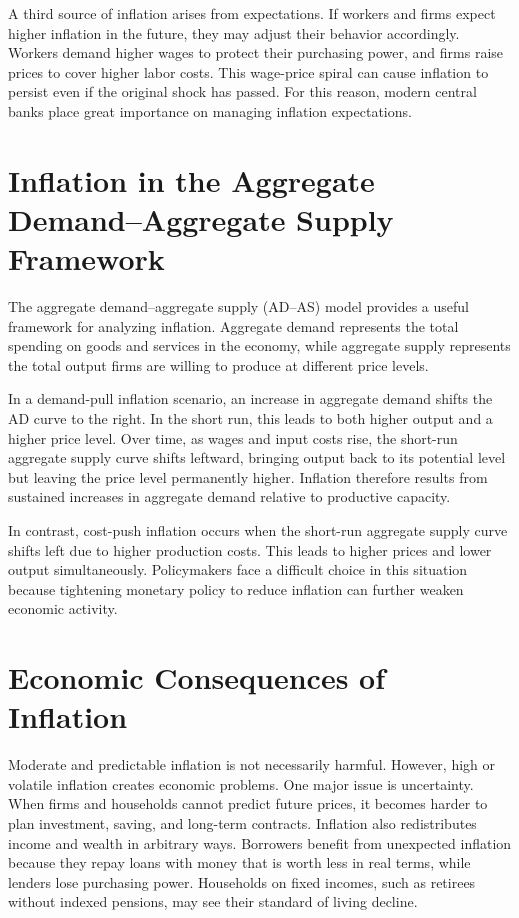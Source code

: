 \documentclass[12pt]{article}
\begin{document}
A third source of inflation arises from expectations. If workers and firms expect higher inflation in the future, they may adjust their behavior accordingly. Workers demand higher wages to protect their purchasing power, and firms raise prices to cover higher labor costs. This wage-price spiral can cause inflation to persist even if the original shock has passed. For this reason, modern central banks place great importance on managing inflation expectations.

\section{Inflation in the Aggregate Demand–Aggregate Supply Framework}

The aggregate demand–aggregate supply (AD–AS) model provides a useful framework for analyzing inflation. Aggregate demand represents the total spending on goods and services in the economy, while aggregate supply represents the total output firms are willing to produce at different price levels.

In a demand-pull inflation scenario, an increase in aggregate demand shifts the AD curve to the right. In the short run, this leads to both higher output and a higher price level. Over time, as wages and input costs rise, the short-run aggregate supply curve shifts leftward, bringing output back to its potential level but leaving the price level permanently higher. Inflation therefore results from sustained increases in aggregate demand relative to productive capacity.

In contrast, cost-push inflation occurs when the short-run aggregate supply curve shifts left due to higher production costs. This leads to higher prices and lower output simultaneously. Policymakers face a difficult choice in this situation because tightening monetary policy to reduce inflation can further weaken economic activity.

\section{Economic Consequences of Inflation}

Moderate and predictable inflation is not necessarily harmful. However, high or volatile inflation creates economic problems. One major issue is uncertainty. When firms and households cannot predict future prices, it becomes harder to plan investment, saving, and long-term contracts. Inflation also redistributes income and wealth in arbitrary ways. Borrowers benefit from unexpected inflation because they repay loans with money that is worth less in real terms, while lenders lose purchasing power. Households on fixed incomes, such as retirees without indexed pensions, may see their standard of living decline.
\end{document}

